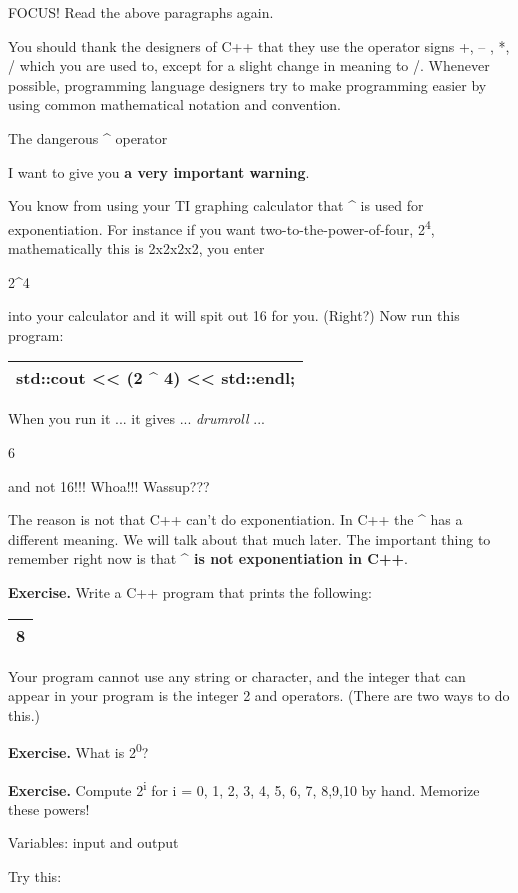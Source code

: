 \documentclass[
]{article}
\begin{document}
FOCUS! Read the above paragraphs again.

You should thank the designers of C++ that they use the operator signs
+, -- , *, / which you are used to, except for a slight change in
meaning to /. Whenever possible, programming language designers try to
make programming easier by using common mathematical notation and
convention.

The dangerous \^{} operator

I want to give you \textbf{a very important warning}.

You know from using your TI graphing calculator that \^{} is used for
exponentiation. For instance if you want two-to-the-power-of-four,
2\textsuperscript{4}, mathematically this is 2x2x2x2, you enter

2\^{}4

into your calculator and it will spit out 16 for you. (Right?) Now run
this program:

\begin{longtable}[]{@{}l@{}}
\toprule
\endhead
std::cout \textless\textless{} (2 \^{} 4) \textless\textless{}
std::endl;\tabularnewline
\bottomrule
\end{longtable}

When you run it ... it gives ... \emph{drumroll} ...

6

and not 16!!! Whoa!!! Wassup???

The reason is not that C++ can't do exponentiation. In C++ the \^{} has
a different meaning. We will talk about that much later. The important
thing to remember right now is that \textbf{\^{} is not exponentiation
in C++}.

\textbf{Exercise.} Write a C++ program that prints the following:

\begin{longtable}[]{@{}l@{}}
\toprule
\endhead
8\tabularnewline
\bottomrule
\end{longtable}

Your program cannot use any string or character, and the integer that
can appear in your program is the integer 2 and operators. (There are
two ways to do this.)

\textbf{Exercise.} What is 2\textsuperscript{0}?

\textbf{Exercise.} Compute 2\textsuperscript{i} for i = 0, 1, 2, 3, 4,
5, 6, 7, 8,9,10 by hand. Memorize these powers!

Variables: input and output

Try this:
\end{document}
